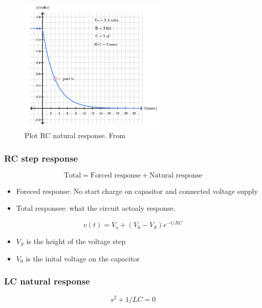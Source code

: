 \begin{figure}[h]
    \centering
    \includegraphics[width=7cm]{image/plot_RC_natural_response.png}
    \caption{Plot RC natural response. From \cite{}}
\end{figure}

\newpage
\subsubsection{RC step response}
\begin{equation}
    \text{Total} = \text{Forced response} + \text{Natural response} 
\end{equation}
\begin{itemize}
    \item Foreced response: No start charge on capasitor and connected voltage supply
    \item Total responsee: what the circuit actoaly response.
\end{itemize}

\begin{equation}
  v(t) = V_s + (V_0-V_S)e^{-t/RC}
\end{equation}
\begin{itemize}
    \item $V_S$ is the height of the voltage step
    \item $V_0$ is the inital voltage on the capacitor
\end{itemize}

\subsubsection{LC natural response}
\begin{equation}
  s^2 + 1/LC = 0
\end{equation}

